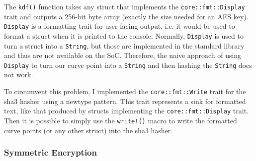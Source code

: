 The \verb+kdf()+ function takes any struct that implements the \texttt{core::fmt::Display} trait and outputs a 256-bit byte array (exactly the size needed for an AES key).
\texttt{Display} is a formatting trait for user-facing output, i.e. it would be used to format a struct when it is printed to the console.
Normally, \texttt{Display} is used to turn a struct into a \verb+String+, but those are implemented in the standard library and thus are not available on the SoC.
Therefore, the naive approach of using \texttt{Display} to turn our curve point into a \texttt{String} and then hashing the \texttt{String} does not work.

To circumvent this problem, I implemented the \verb+core::fmt::Write+ trait for the \acrshort{sha3} hasher using a newtype pattern.
This trait represents a sink for formatted text, like that produced by structs implementing the \verb+core::fmt::Display+ trait.
Then it is possible to simply use the \verb+write!()+ macro to write the formatted curve points (or any other struct) into the \acrshort{sha3} hasher.

\subsubsection{Symmetric Encryption}